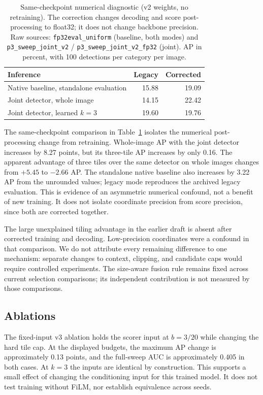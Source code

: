 \documentclass[conference]{IEEEtran}
\begin{document}
\begin{table}[t]
\caption{Same-checkpoint numerical diagnostic (v2 weights, no retraining). The correction changes decoding and score post-processing to float32; it does not change backbone precision. Raw sources: \texttt{fp32eval\_uniform} (baseline, both modes) and \texttt{p3\_sweep\_joint\_v2} / \texttt{p3\_sweep\_joint\_v2\_fp32} (joint). AP in percent, with 100 detections per category per image.}
\label{tab:precision}
\centering
\begin{tabular}{p{}rr}
\toprule
Inference & Legacy & Corrected \\
\midrule
Native baseline, standalone evaluation & 15.88 & 19.09 \\
Joint detector, whole image & 14.15 & 22.42 \\
Joint detector, learned $k=3$ & 19.60 & 19.76 \\
\bottomrule
\end{tabular}
\end{table}
The same-checkpoint comparison in Table~\ref{tab:precision} isolates the numerical post-processing change from retraining. Whole-image AP with the joint detector increases by 8.27 points, but its three-tile AP increases by only 0.16. The apparent advantage of three tiles over the same detector on whole images changes from $+5.45$ to $-2.66$ AP. The standalone native baseline also increases by 3.22 AP from the unrounded values; legacy mode reproduces the archived legacy evaluation. This is evidence of an asymmetric numerical confound, not a benefit of new training. It does not isolate coordinate precision from score precision, since both are corrected together.

The large unexplained tiling advantage in the earlier draft is absent after corrected training and decoding. Low-precision coordinates were a confound in that comparison. We do not attribute every remaining difference to one mechanism: separate changes to context, clipping, and candidate caps would require controlled experiments. The size-aware fusion rule remains fixed across current selection comparisons; its independent contribution is not measured by those comparisons.

\subsection{Ablations}
\label{sec:ablations}

The fixed-input v3 ablation holds the scorer input at $b=3/20$ while changing the hard tile cap. At the displayed budgets, the maximum AP change is approximately 0.13 points, and the full-sweep AUC is approximately 0.405 in both cases. At $k=3$ the inputs are identical by construction. This supports a small effect of changing the conditioning input for this trained model. It does not test training without FiLM, nor establish equivalence across seeds.
\end{document}
